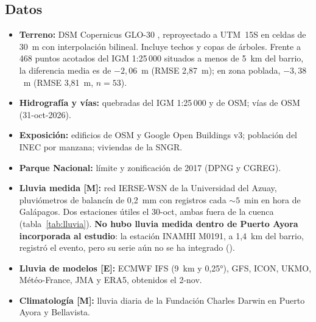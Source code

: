 \documentclass{sosg-informe}
\begin{document}
\subsection{Datos}
\begin{itemize}
  \item \textbf{Terreno:} DSM Copernicus GLO-30 \citep{esa2021}, reproyectado a UTM~15S en celdas de 30~m con interpolación bilineal. Incluye techos y copas de árboles. Frente a 468 puntos acotados del IGM 1:25\,000 situados a menos de 5~km del barrio, la diferencia media es de $-2,06$~m (RMSE 2,87~m); en zona poblada, $-3,38$~m (RMSE 3,81~m, $n = 53$).
  \item \textbf{Hidrografía y vías:} quebradas del IGM 1:25\,000 y de OSM; vías de OSM (31-oct-2026).
  \item \textbf{Exposición:} edificios de OSM y Google Open Buildings v3; población del INEC por manzana; viviendas de la SNGR.
  \item \textbf{Parque Nacional:} límite y zonificación de 2017 (DPNG y CGREG).
  \item \textbf{Lluvia medida [M]:} red IERSE-WSN de la Universidad del Azuay, pluviómetros de balancín de 0,2~mm con registros cada ${\sim}5$~min en hora de Galápagos. Dos estaciones útiles el 30-oct, ambas fuera de la cuenca (tabla~\ref{tab:lluvia}). \textbf{No hubo lluvia medida dentro de Puerto Ayora incorporada al estudio}: la estación INAMHI M0191, a 1,4~km del barrio, registró el evento, pero su serie aún no se ha integrado ().
  \item \textbf{Lluvia de modelos [E]:} ECMWF IFS (9~km y 0,25°), GFS, ICON, UKMO, Météo-France, JMA y ERA5, obtenidos el 2-nov.
  \item \textbf{Climatología [M]:} lluvia diaria de la Fundación Charles Darwin en Puerto Ayora y Bellavista.
\end{itemize}
\end{document}
